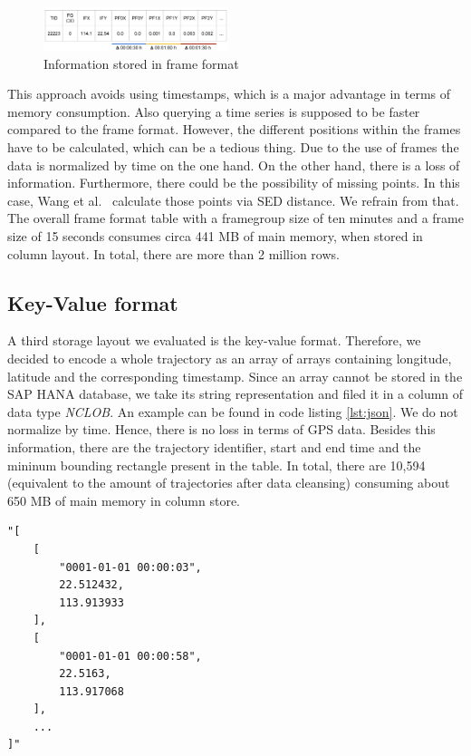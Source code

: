 \documentclass[10pt]{sig-alternate}
\begin{document}
\begin{figure}[ht]
\centering
\includegraphics[width=0.48\textwidth]{img/frame_format.png}
\caption{Information stored in frame format}
\label{fig:frame_format}
\end{figure}

This approach avoids using timestamps, which is a major advantage in terms of memory consumption. Also querying a time series is supposed to be faster compared to the frame format. However, the different positions within the frames have to be calculated, which can be a tedious thing. Due to the use of frames the data is normalized by time on the one hand. On the other hand, there is a loss of information. Furthermore, there could be the possibility of missing points. In this case, Wang et al.~\cite{wang} calculate those points via SED distance. We refrain from that. The overall frame format table with a framegroup size of ten minutes and a frame size of 15 seconds consumes circa 441 MB of main memory, when stored in column layout. In total, there are more than 2 million rows.

\subsection{Key-Value format}

A third storage layout we evaluated is the key-value format. Therefore, we decided to encode a whole trajectory as an array of arrays containing longitude, latitude and the corresponding timestamp. Since an array cannot be stored in the SAP HANA database, we take its string representation and filed it in a column of data type \textit{NCLOB}. An example can be found in code listing \ref{lst:json}. We do not normalize by time. Hence, there is no loss in terms of GPS data. Besides this information, there are the trajectory identifier, start and end time and the mininum bounding rectangle present in the table. In total, there are 10,594 (equivalent to the amount of trajectories after data cleansing) consuming about 650 MB of main memory in column store.

\lstset{language=json}
\begin{minipage}{0.45\textwidth}
\begin{lstlisting}[frame=single, firstnumber=1, caption=Key-Value format example entry,label=lst:json]
"[
    [
        "0001-01-01 00:00:03",
        22.512432,
        113.913933
    ],
    [
        "0001-01-01 00:00:58",
        22.5163,
        113.917068
    ],
    ...
]"
\end{lstlisting}
\end{minipage}
\end{document}
